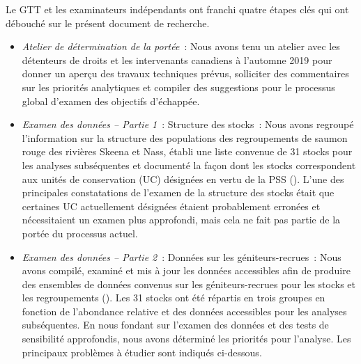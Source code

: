 \documentclass[french,11pt]{book}
\begin{document}
Le GTT et les examinateurs indépendants ont franchi quatre étapes clés qui ont débouché sur le présent document de recherche.
\begin{itemize}
\item
  \emph{Atelier de détermination de la portée}~: Nous avons tenu un atelier avec les détenteurs de droits et les intervenants canadiens à l'automne 2019 pour donner un aperçu des travaux techniques prévus, solliciter des commentaires sur les priorités analytiques et compiler des suggestions pour le processus global d'examen des objectifs d'échappée.
\item
  \emph{Examen des données -- Partie 1}~: Structure des stocks~: Nous avons regroupé l'information sur la structure des populations des regroupements de saumon rouge des rivières Skeena et Nass, établi une liste convenue de 31 stocks pour les analyses subséquentes et documenté la façon dont les stocks correspondent aux unités de conservation (UC) désignées en vertu de la PSS (). L'une des principales constatations de l'examen de la structure des stocks était que certaines UC actuellement désignées étaient probablement erronées et nécessitaient un examen plus approfondi, mais cela ne fait pas partie de la portée du processus actuel.
\item
  \emph{Examen des données -- Partie 2}~: Données sur les géniteurs-recrues~: Nous avons compilé, examiné et mis à jour les données accessibles afin de produire des ensembles de données convenus sur les géniteurs-recrues pour les stocks et les regroupements (). Les 31 stocks ont été répartis en trois groupes en fonction de l'abondance relative et des données accessibles pour les analyses subséquentes. En nous fondant sur l'examen des données et des tests de sensibilité approfondis, nous avons déterminé les priorités pour l'analyse. Les principaux problèmes à étudier sont indiqués ci-dessous.
  \begin{enumerate}
  \def\labelenumi{\arabic{enumi}.}


\end{enumerate}
\end{itemize}
\end{document}
